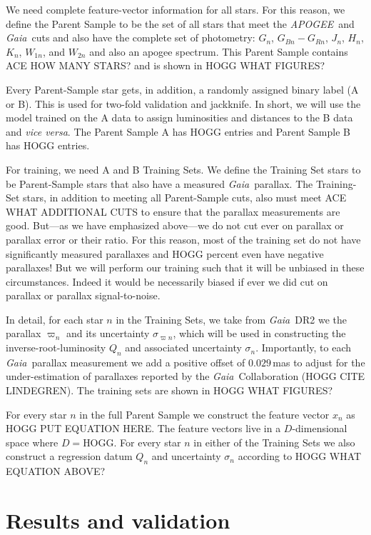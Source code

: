 \documentclass[modern]{aastex62}
\newcommand{\foreign}[1]{\textsl{#1}}
\newcommand{\acronym}[1]{{\small{#1}}}
\newcommand{\project}[1]{\textsl{#1}}
\newcommand{\apogee}{\project{\acronym{APOGEE}}}
\newcommand{\gaia}{\project{Gaia}}
\begin{document}
We need complete feature-vector information for all stars.  For this
reason, we define the Parent Sample to be the set of all stars that
meet the \apogee\ and \gaia\ cuts and also
have the complete set of photometry: $G_n$, $G_{Bn}-G_{Rn}$, $J_n$,
$H_n$, $K_n$, $W_{1n}$, and $W_{2n}$ and also an apogee spectrum.
This Parent Sample contains ACE HOW MANY STARS? and is shown in HOGG WHAT FIGURES?

Every Parent-Sample star gets, in addition, a randomly assigned binary
label (A or B).
This is used for two-fold validation and jackknife.
In short, we will use the model trained on the A data to assign luminosities
and distances to the B data and \foreign{vice versa}.
The Parent Sample A has HOGG entries and Parent Sample B has HOGG entries.

For training, we need A and B Training Sets.
We define the Training Set stars to be Parent-Sample stars that also
have a measured \gaia\ parallax.
The Training-Set stars, in addition to meeting all Parent-Sample cuts,
also must meet ACE WHAT ADDITIONAL CUTS to ensure that the parallax
measurements are good.
But---as we have emphasized above---we do not cut ever on parallax or
parallax error or their ratio. For this reason, most of the training set
do not have significantly measured parallaxes and HOGG percent even have
negative parallaxes!
But we will perform our training such that it will be unbiased in these
circumstances.
Indeed it would be necessarily biased if ever we did cut on parallax or
parallax signal-to-noise.

In detail,
for each star $n$ in the Training Sets, we take from \gaia\ DR2 we the parallax $\varpi_n$
and its uncertainty $\sigma_{\varpi n}$, which will be used in
constructing the inverse-root-luminosity $Q_n$ and associated
uncertainty $\sigma_n$.
Importantly, to each \gaia\ parallax measurement we add a positive
offset of $0.029$\,mas to adjust for the under-estimation of
parallaxes reported by the \gaia\ Collaboration (HOGG CITE LINDEGREN).
The training sets are shown in HOGG WHAT FIGURES?

For every star $n$ in the full Parent Sample we construct the feature
vector $x_n$ as HOGG PUT EQUATION HERE.
The feature vectors live in a $D$-dimensional space where $D=$HOGG.
For every star $n$ in either of the Training Sets we also construct a
regression datum $Q_n$ and uncertainty $\sigma_n$ according to HOGG WHAT EQUATION ABOVE?

\section{Results and validation}
\end{document}
